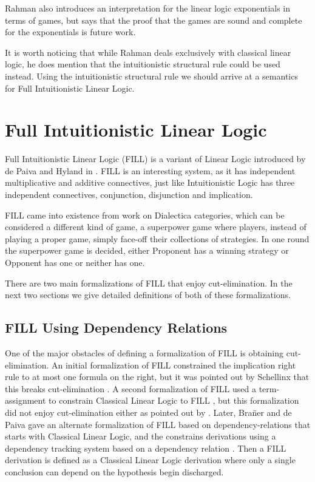 \documentclass{article}
\begin{document}
 
Rahman also introduces an interpretation for the linear logic
exponentials in terms of games, but says that the proof that the games
are sound and complete for the exponentials is future work.
 
It is worth noticing that while Rahman deals exclusively with
classical linear logic, he does mention that the intuitionistic
structural rule could be used instead. Using the intuitionistic
structural rule we should arrive at a semantics for Full
Intuitionistic Linear Logic.
 
\section*{Full Intuitionistic Linear Logic}

Full Intuitionistic Linear Logic (FILL) is a variant of Linear Logic
introduced by de Paiva and Hyland in \cite{Hyland:1993}. FILL is an
interesting system, as it has independent multiplicative and additive
connectives, just like Intuitionistic Logic has three independent
connectives, conjunction, disjunction and implication.

FILL came into existence from work on Dialectica categories, which can
be considered a different kind of game, a superpower game where
players, instead of playing a proper game, simply face-off their
collections of strategies. In one round the superpower game is
decided, either Proponent has a winning strategy or Opponent has one
or neither has one.

There are two main formalizations of FILL that enjoy cut-elimination.
In the next two sections we give detailed definitions of both of these
formalizations.

\subsection*{FILL Using Dependency Relations}
\label{subsec:fill_using_dependency_relations}
One of the major obstacles of defining a formalization of FILL is
obtaining cut-elimination.  An initial formalization of FILL
constrained the implication right rule to at most one formula on the
right, but it was pointed out by Schellinx that this breaks
cut-elimination \cite{Schellinx:1991}.  A second formalization of FILL
used a term-assignment to constrain Classical Linear Logic to FILL
\cite{Hyland:1993}, but this formalization did not enjoy
cut-elimination either as pointed out by \cite{Bierman:1996a}.  Later,
Bra\"ner and de Paiva gave an alternate formalization of FILL based on
dependency-relations that starts with Classical Linear Logic, and the
constrains derivations using a dependency tracking system based on a
dependency relation \cite{Brauner:1998}.  Then a FILL derivation is
defined as a Classical Linear Logic derivation where only a single
conclusion can depend on the hypothesis begin discharged.
\end{document}
